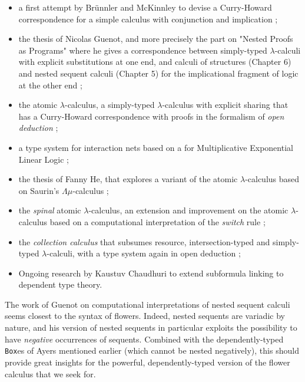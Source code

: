 \begin{itemize}
  \item a first attempt by Brünnler and McKinnley to devise a Curry-Howard
  correspondence for a simple   calculus with
  conjunction and implication ;
  \item the thesis of Nicolas Guenot, and more precisely the part on "Nested
  Proofs as Programs" where he gives a correspondence between simply-typed
  $\lambda$-calculi with explicit substitutions at one end, and calculi of
  structures (Chapter 6) and nested sequent calculi (Chapter 5) for the
  implicational fragment of  logic at the other end
  \cite{guenot_nested_2013};
  \item the atomic $\lambda$-calculus, a simply-typed $\lambda$-calculus with
  explicit sharing that has a Curry-Howard correspondence with proofs in the
  formalism of \emph{open deduction} ;
  \item a type system for interaction nets based on a  for
  Multiplicative Exponential Linear Logic ;
  \item the thesis of Fanny He, that explores a  variant of the atomic
  $\lambda$-calculus based on Saurin's $\Lambda\mu$-calculus
  ;
  \item the \emph{spinal} atomic $\lambda$-calculus, an extension and
  improvement on the atomic $\lambda$-calculus based on a computational
  interpretation of the \emph{switch} rule ;
  \item the \emph{collection calculus} that subsumes resource,
  intersection-typed and simply-typed $\lambda$-calculi, with a type system
  again in open deduction ;
  \item Ongoing research by Kaustuv Chaudhuri to extend subformula linking to
  dependent type theory.
\end{itemize}
The work of Guenot on computational interpretations of nested sequent calculi
seems closest to the syntax of flowers. Indeed, nested sequents are variadic by
nature, and his version of nested sequents in particular exploits the
possibility to have \emph{negative} occurrences of sequents. Combined with the
dependently-typed \texttt{Box}es of Ayers mentioned earlier (which cannot be
nested negatively), this should provide great insights for the powerful,
dependently-typed version of the flower calculus that we seek for.

